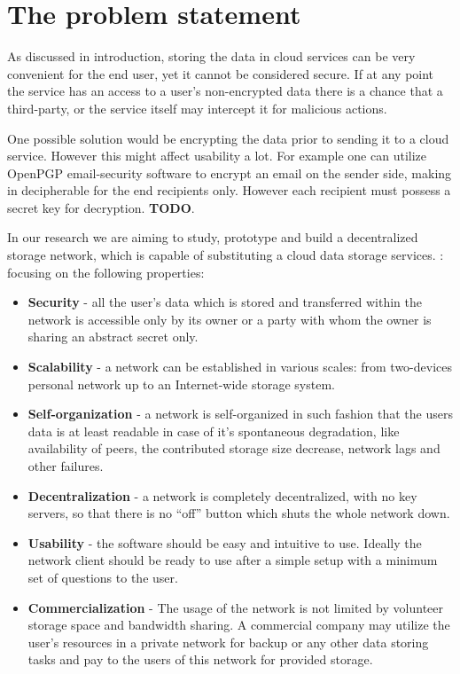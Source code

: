 \section{The problem statement}

As discussed in introduction, storing the data in cloud services
can be very convenient for the end user, yet it cannot be considered
secure. If at any point the service has an access to a user's non-encrypted
data there is a chance that a third-party, or the service itself
may intercept it for malicious actions.

One possible solution would be encrypting the data prior to sending it
to a cloud service. However this might affect usability a lot. For
example one can utilize OpenPGP email-security software \citep{rfc3156} to
encrypt an email on the sender side, making in decipherable for
the end recipients only. However each recipient must possess a secret
key for decryption. \textbf{TODO}.

In our research we are aiming to study, prototype and build a decentralized
\pp storage network, which is capable of substituting a cloud data storage
services.
:
focusing on the following properties:

\begin{itemize}
\item \textbf{Security} - all the user's data which is stored and transferred
  within the network is accessible only by its owner or a party with whom the
  owner is sharing an abstract secret only.
\item \textbf{Scalability} - a network can be established in various
  scales: from two-devices personal network up to an Internet-wide storage
  system.
\item \textbf{Self-organization} - a network is self-organized in such
  fashion that the users data is at least readable in case of it's spontaneous
  degradation, like availability of peers, the contributed storage size
  decrease, network lags and other failures.
\item \textbf{Decentralization} - a network is completely decentralized,
  with no key servers, so that there is no ``off'' button which shuts the
  whole network down.
\item \textbf{Usability} - the software should be easy and intuitive to
  use. Ideally the network client should be ready to use after a  simple
  setup with a minimum set of questions to the user.
\item \textbf{Commercialization} - The usage of the network is not limited
  by volunteer storage space and bandwidth sharing. A commercial company
  may utilize the user's resources in a private network for backup or any
  other data storing tasks and pay to the users of this network for provided
  storage.
\end{itemize}

